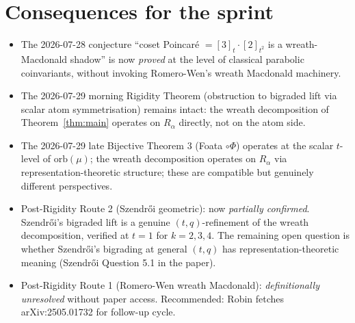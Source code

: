 \documentclass[11pt]{article}
\theoremstyle{remark}
\begin{document}
\section{Consequences for the sprint}

\begin{itemize}
\item The 2026-07-28 conjecture ``coset Poincar\'e $= [3]_t \cdot [2]_{t^2}$
      is a wreath-Macdonald shadow'' is now \emph{proved} at the level of
      classical parabolic coinvariants, without invoking Romero-Wen's wreath
      Macdonald machinery.
\item The 2026-07-29 morning Rigidity Theorem (obstruction to bigraded lift
      via scalar atom symmetrisation) remains intact: the wreath decomposition
      of Theorem~\ref{thm:main} operates on $R_\alpha$ directly, not on the
      atom side.
\item The 2026-07-29 late Bijective Theorem 3 (Foata $\circ \Phi$) operates
      at the scalar $t$-level of $\mathrm{orb}(\mu)$; the wreath decomposition
      operates on $R_\alpha$ via representation-theoretic structure; these
      are compatible but genuinely different perspectives.
\item Post-Rigidity Route 2 (Szendr\H oi geometric): now \emph{partially
      confirmed}. Szendr\H oi's bigraded lift is a genuine $(t,q)$-refinement
      of the wreath decomposition, verified at $t=1$ for $k = 2, 3, 4$.
      The remaining open question is whether Szendr\H oi's bigrading at
      general $(t, q)$ has representation-theoretic meaning
      (Szendr\H oi Question 5.1 in the paper).
\item Post-Rigidity Route 1 (Romero-Wen wreath Macdonald):
      \emph{definitionally unresolved} without paper access.
      Recommended: Robin fetches arXiv:2505.01732 for follow-up cycle.
\end{itemize}
\end{document}
